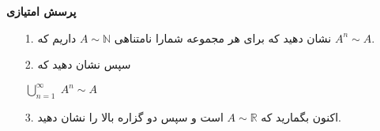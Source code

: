 \textbf{پرسش امتیازی}\\[0.1in]
\begin{enumerate}
    \item[1.]نشان دهید که برای هر مجموعه شمارا نامتناهی
    $A \sim \mathbb{N}$ داریم که
    $A^n \sim A$.\\[0.1in]
    \item[2.] سپس نشان دهید که
    \begin{center}
        $\displaystyle \bigcup_{n=1}^{\infty}
        \; A^n \sim A$\\[0.15in]
    \end{center}
    \item[3.] اکنون بگمارید که
    $A \sim \mathbb{R}$ است و سپس دو گزاره بالا را نشان دهید.
\end{enumerate}